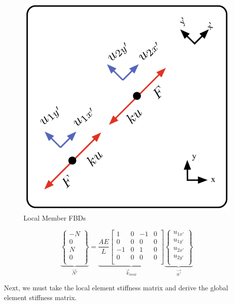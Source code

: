 \begin{center}
	\begin{figure}[h]	\centerline{\includegraphics[width=0.7\columnwidth]{Figures/LocalMemberStiffness}}
		\caption{Local Member FBDs}
		\label{fig:LocalMemberStiffness}
	\end{figure}
\end{center}


\begin{equation}
	\underbrace{
		\begin{Bmatrix}
			-N\\ 0\\ \hline N\\ 0\\
		\end{Bmatrix}
	}_{\vec{N}'}
	=
	\underbrace{
		\frac{AE}{L}
		\begin{bmatrix}
			1 & 0 & -1 & 0\\
			0 & 0 & 0 & 0\\
			-1 & 0 & 1 & 0\\
			0 & 0 & 0 & 0\\
		\end{bmatrix}
	}_{\vec{k}_{local}}
	\underbrace{
		\begin{Bmatrix}
			u_{1x'}\\ u_{1y'}\\ \hline u_{2x'}\\ u_{2y'}\\
		\end{Bmatrix}
	}_{\vec{u'}}
	\label{Eq:F=ku}
\end{equation}

Next, we must take the local element stiffness matrix and derive the global element stiffness matrix.

